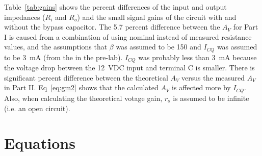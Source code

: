 Table~\ref{tab:gains} shows the percent differences of the input and output impedances ($R_i$ and $R_o$) and the small signal gains of the circuit with and without the bypass capacitor.
The 5.7 percent difference between the $A_V$ for Part I is caused from a combination of using nominal instead of measured resistance values, and the assumptions that $\beta$ was assumed to be 150 and  $I_{CQ}$ was assumed to be \SI{3}{mA} (from the in the pre-lab). $I_{CQ}$ was probably less than \SI{3}{mA} because the voltage drop between the \SI{12}{VDC} input and terminal C is smaller. There is significant percent difference between the theoretical $A_V$ versus the measured $A_V$ in Part II. Eq~\ref{eq:gm2} shows that the calculated $A_V$ is affected more by $I_{CQ}$. Also, when calculating the theoretical votage gain, $r_o$ is assumed to be infinite (i.e. an open circuit). %


\section{Equations}

